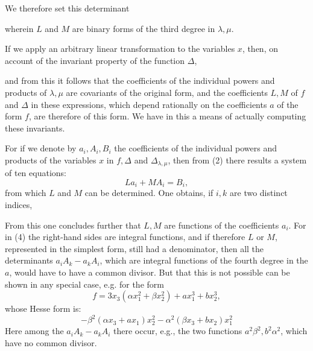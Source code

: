 We therefore set this determinant

wherein $L$ and $M$ are binary forms of the third degree in
$\lambda, \mu$.

If we apply an arbitrary linear transformation to the variables $x$,
then, on account of the invariant property of the function $\Delta$,

and from this it follows that the coefficients of the individual powers
and products of $\lambda, \mu$ are covariants of the original form, and
the coefficients $L, M$ of $f$ and $\Delta$ in these expressions, which
depend rationally on the coefficients $a$ of the form $f$, are therefore
 of this form. We have in this a means of actually computing
these invariants.

For if we denote by $a_i, A_i, B_i$ the coefficients of the
individual powers and products of the variables $x$ in $f, \Delta$ and
$\Delta_{\lambda,\mu}$, then from (2) there results a system of ten
equations:
\[
L a_i + M A_i = B_i,
\]
from which $L$ and $M$ can be determined. One obtains, if $i, k$ are two
distinct indices,

From this one concludes further that $L, M$ are 
functions of the coefficients $a_i$. For in (4) the right-hand sides are
integral functions, and if therefore $L$ or $M$, represented in the
simplest form, still had a denominator, then all the determinants
$a_iA_k - a_kA_i$, which are integral functions of the fourth degree in
the $a$, would have to have a common divisor. But that this is not
possible can be shown in any special case, e.g. for the form
\[
f = 3x_3(\alpha x_1^2 + \beta x_2^2) + a x_1^3 + b x_2^3,
\]
whose Hesse form is:
\[
-\beta^2(\alpha x_3 + a x_1)x_2^2 - \alpha^2(\beta x_3 + b x_2)x_1^2
\]
Here among the $a_iA_k - a_kA_i$ there occur, e.g., the two
functions $a^2\beta^2, b^2\alpha^2$, which have no common
divisor.
